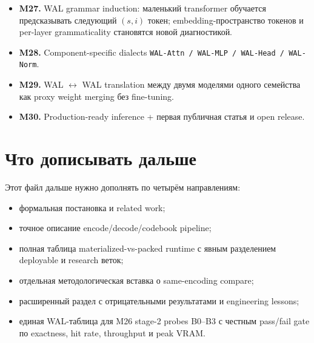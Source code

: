 \begin{itemize}[leftmargin=1.5em]
Следующий шаг уже был намеренно двухшаговым и percentile-driven: сначала
\texttt{m27\_wal\_sbc\_budget\_profile.py} измеряет реальные CDF для
\texttt{atom\_output\_rel\_mse} и best-residual error на сохранённом
expressive-atom ISA, затем \texttt{m27\_wal\_sbc\_tune\_proto.py} гоняет
только узкий grid с screening на \texttt{4} окнах и честным gate лишь для
лучших \texttt{2} конфигураций на \texttt{16} окнах. Это даёт более чистый
verdict: loose percentile budgets действительно мгновенно оживляют non-literal
path (у лучших finalists \texttt{mean\_nonliteral\_calls \~ 3.85},
\texttt{avg\_program\_length \~ 4.8}), но ломают sacred quality bar
(\texttt{16}-window \texttt{PPL delta vs strict legacy \~ +0.37}). Значит,
этот результат уже оправдывает переход к WAL-CDA: следующий шаг должен менять
сам basis через экономически ограниченный context-aware atom layer, а не делать
ещё один blind widening budgets. При этом сам CDA-probe тоже должен быть жёстко
ограничен: embeddings для дискретных identity-сигналов, только cheap detached
activation summary вместо полного live input, factorized low-rank delta поверх
base prior и soft expected-cost usefulness surrogate против лучшего старого
accepted path на том же budget-contract. Если SBC когда-то и продолжать отдельно, то
только через существенно более tight или shape-aware acceptance geometry.

\item \textbf{M27.} WAL grammar induction: маленький transformer обучается
предсказывать следующий $(s,i)$ токен; embedding-пространство токенов и
per-layer grammaticality становятся новой диагностикой.
\item \textbf{M28.} Component-specific dialects \texttt{WAL-Attn / WAL-MLP /
WAL-Head / WAL-Norm}.
\item \textbf{M29.} WAL $\leftrightarrow$ WAL translation между двумя моделями
одного семейства как proxy weight merging без fine-tuning.
\item \textbf{M30.} Production-ready inference + первая публичная статья и
open release.
\end{itemize}

\section{Что дописывать дальше}

Этот файл дальше нужно дополнять по четырём направлениям:

\begin{itemize}[leftmargin=1.5em]
\item формальная постановка и related work;
\item точное описание encode/decode/codebook pipeline;
\item полная таблица materialized-vs-packed runtime с явным разделением
deployable и research веток;
\item отдельная методологическая вставка о same-encoding compare;
\item расширенный раздел с отрицательными результатами и engineering lessons;
\item единая WAL-таблица для M26 stage-2 probes B0--B3 с честным pass/fail gate
по exactness, hit rate, throughput и peak VRAM.
\end{itemize}